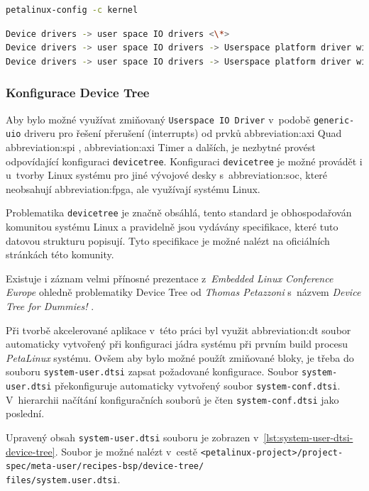\documentclass[a4paper, twoside, 11pt]{article}
\newcommand{\fbar}{\FloatBarrier}
\begin{document}
\begin{lstlisting}[language={sh}, caption={PetaLinux příkaz pro konfiguraci jádra systému.}, label= {lst:petalinux-config-c-kernel}, morekeywords={petalinux-build, petalinux-package, petalinux-config}]
petalinux-config -c kernel\end{lstlisting}

\begin{lstlisting}[language={sh}, caption={PetaLinux konfigurace pro User Space IO Driver.}, label= {lst:petalinux-config-c-kernel-userspace-io-driver}]
Device drivers -> user space IO drivers <\*>
Device drivers -> user space IO drivers -> Userspace platform driver with generic irq and dynamic memory <*>
Device drivers -> user space IO drivers -> Userspace platform driver with generic IRQ handling <*>\end{lstlisting}

		\fbar
		\subsubsection{Konfigurace Device Tree}\label{subsubsec:konfigurace-device-tree}
		Aby bylo možné využívat zmiňovaný \texttt{Userspace IO Driver} v~podobě \texttt{generic-uio} driveru pro řešení přerušení (interrupts) od prvků \gls{abbreviation:axi} Quad \gls{abbreviation:spi} \cite{axi-quad-spi-ip-product-guide}, \gls{abbreviation:axi} Timer \cite{axi-timer-v-2-0-ip-product-guide} a dalších, je nezbytné provést odpovídající konfiguraci \texttt{devicetree}. Konfiguraci \texttt{devicetree} je možné provádět i u~tvorby Linux systému pro jiné vývojové desky s~\gls{abbreviation:soc}, které neobsahují \gls{abbreviation:fpga}, ale využívají systému Linux.\par
		Problematika \texttt{devicetree} je značně obsáhlá, tento standard je obhospodařován komunitou systému Linux a pravidelně jsou vydávány specifikace, které tuto datovou strukturu popisují. Tyto specifikace je možné nalézt na oficiálních stránkách této komunity. \cite{devicetree-org-specification}\par
		Existuje i záznam velmi přínosné prezentace z~\textit{Embedded Linux Conference Europe} ohledně problematiky Device Tree od \textit{Thomas Petazzoni} s~názvem \textit{Device Tree for Dummies!} \cite{youtube-devicetree-for-dummies}.\par
		Při tvorbě akcelerované aplikace v~této práci byl využit \gls{abbreviation:dt} soubor automaticky vytvořený při konfiguraci jádra systému při prvním build procesu \textit{PetaLinux} systému. Ovšem aby bylo možné použít zmiňované bloky, je třeba do souboru \texttt{system-user.dtsi} zapsat požadované konfigurace. Soubor \texttt{system-user.dtsi} překonfiguruje automaticky vytvořený soubor \texttt{system-conf.dtsi}. V~hierarchii načítání konfiguračních souborů je čten \texttt{system-conf.dtsi} jako poslední.\par
		Upravený obsah \texttt{system-user.dtsi} souboru je zobrazen v~\ref{lst:system-user-dtsi-device-tree}. Soubor je možné nalézt v~cestě \texttt{<petalinux-project>/project-spec/meta-user/recipes-bsp/device-tree/\\files/system.user.dtsi}.\par
\end{document}
